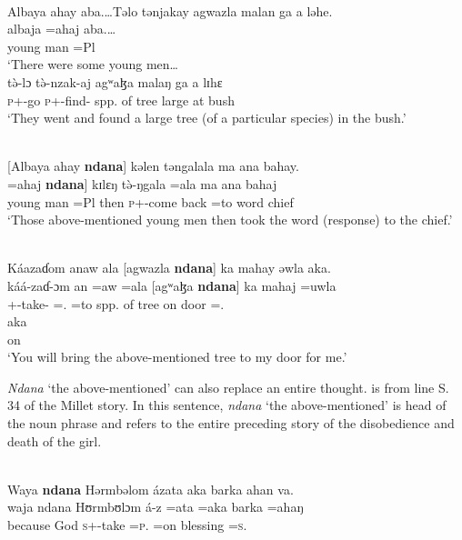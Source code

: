 \ea \label{ex:3:65}\\
Albaya  ahay  aba.\ldots  Təlo  tənjakay  agwazla  malan  ga  a  ləhe.\\
\gll  albaja  =ahaj  aba.\ldots \\
      {young man}   =Pl  {\EXT}\\
\glt  ‘There were some young men\ldots\\
\medskip
\gll t\`{ə}-lɔ            t\`{ə}-nzak-aj           agʷaɮa    malaŋ     ga   a  lɪhɛ\\
     \textsc{p}+{\PFV}-go   \textsc{p}+{\PFV}-find-{\CL}  {spp. of tree}  large    {\ADJ}  at  bush\\
\glt ‘They went and found a large tree (of a particular species) in the bush.’
\z

\ea \label{ex:3:66}\\
{[}Albaya  ahay  \textbf{ndana}]  kəlen  təngalala  ma  ana  bahay.\\
\gll {[albaja}   =ahaj  \textbf{ndana}]  kɪlɛŋ  t\`{ə}-ŋgala      =ala   ma  ana   bahaj\\
     {young man}    =Pl         {\DEM}  then  {\textsc{p}+{\PFV}-come back}  =to  word  {\DAT} chief\\ 
\glt ‘Those above-mentioned young men then took the word (response) to the chief.’
\z

\ea \label{ex:3:67}\\
Káazaɗom  anaw  ala  [agwazla  \textbf{ndana}]  ka  mahay  əwla  aka.\\
\gll káá-zaɗ{}-ɔm    an   =aw   =ala  [agʷaɮa  \textbf{ndana}]  ka  mahaj  =uwla     \\
    {\twoP}+{\POT}-take-{\twoP}  {\DAT} ={\oneS}.{\IO} =to    {spp. of tree}  {\DEM}  on       door         ={\oneS}.{\POSS}  \\
    
    \medskip
\gll aka\\
     on\\
\glt ‘You will bring the above-mentioned tree to my door for me.’
\z

\textit{Ndana} ‘the above-mentioned’ can also replace an entire thought.  is from line S. 34 of the Millet story. In this sentence, \textit{ndana}  ‘the above-mentioned’ is head of the noun phrase and refers to the entire preceding story of the disobedience and death of the girl. 

\ea \label{ex:3:68}\\
Waya  \textbf{ndana}  Hərmbəlom  ázata  aka  barka  ahan  va.\\
\gll  waja   ndana  Hʊrmbʊlɔm   á-z    =ata      =aka   barka     =ahaŋ   \\
      because   {\DEM}   God             \textsc{s}+{\IFV}-take  =\textsc{p}.{\IO}  =on   blessing  =\textsc{s}.{\POSS}  \\
      
